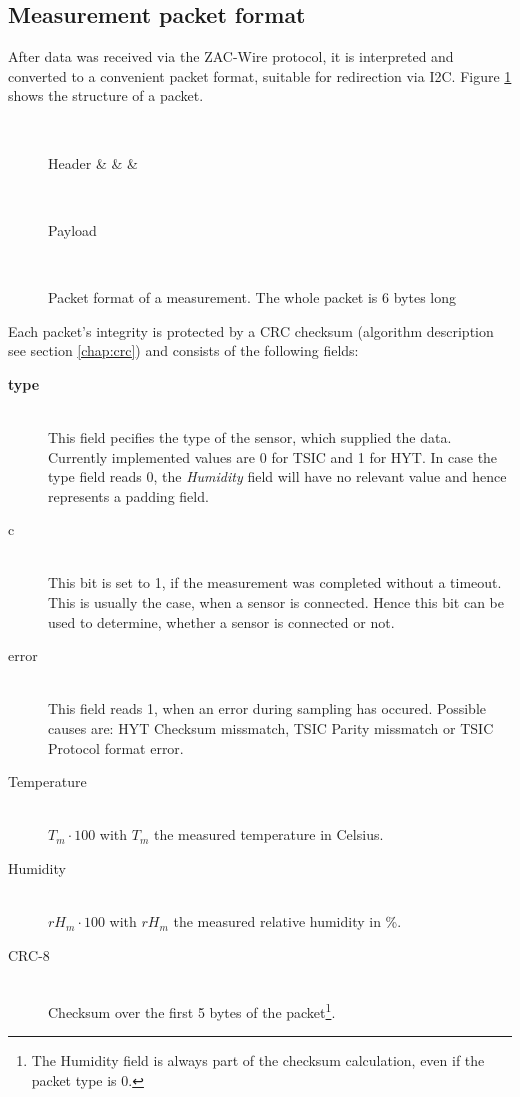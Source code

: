 \documentclass[a4paper]{scrreprt}
\begin{document}
\subsection{Measurement packet format}\label{chap:packet}
After data was received via the ZAC-Wire protocol, it is interpreted and converted to a convenient packet format, suitable for
redirection via I2C. Figure \ref{fig:packet} shows the structure of a packet.
\begin{figure}[Hh!]
	\centering
	\begin{bytefield}[endianness=big, bitwidth=2.1em]{8}
		\\
		\begin{rightwordgroup}{Header}
			 &  &  & 
		\end{rightwordgroup}\\
		\begin{rightwordgroup}{Payload}
			\\
		\end{rightwordgroup}\\
	\end{bytefield}
  \caption{Packet format of a measurement. The whole packet is 6 bytes long}
	\label{fig:packet}
\end{figure}
Each packet's integrity is protected by a CRC checksum (algorithm description see section \ref{chap:crc}) and consists of the following fields:\\
\begin{description}
	\item[\textbf{type}] \hfill\\
        This field pecifies the type of the sensor, which supplied the data. Currently implemented values are 0
		for TSIC and 1 for HYT. In case the type field reads 0, the \emph{Humidity} field will have no relevant value and hence
		represents a padding field.
	\item[c] \hfill\\
This bit is set to 1, if the measurement was completed without a timeout. This is usually the case, when a
		sensor is connected. Hence this bit can be used to determine, whether a sensor is connected or not.
	\item[error] \hfill\\
This field reads 1, when an error during sampling has occured. Possible causes are: HYT Checksum missmatch,
		TSIC Parity missmatch or TSIC Protocol format error.
	\item[Temperature] \hfill\\
$T_m \cdot 100$ with $T_m$ the measured temperature in Celsius.
	\item[Humidity] \hfill\\
$rH_m \cdot 100$ with $rH_m$ the measured relative humidity in \%.
	\item[CRC-8] \hfill\\
Checksum over the first 5 bytes of the packet\footnote{The Humidity field is always part of the checksum
		calculation, even if the packet type is 0.}.
\end{description}
\end{document}
